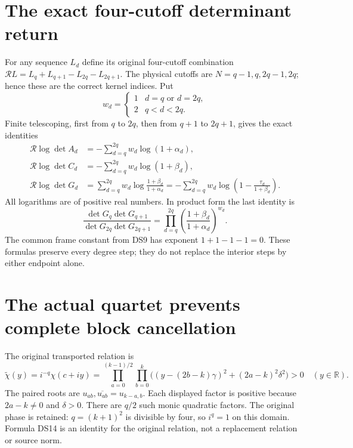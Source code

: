 \documentclass[11pt]{article}
\newcommand{\R}{\mathbb R}
\begin{document}
\section{The exact four-cutoff determinant return}

For any sequence \(L_d\) define its original four-cutoff combination
\(\mathcal RL=L_q+L_{q+1}-L_{2q}-L_{2q+1}\).
The physical cutoffs are \(N=q-1,q,2q-1,2q\); hence these are the
correct kernel indices. Put
\[
w_d=\begin{cases}1&d=q\text{ or }d=2q,\\2&q<d<2q.\end{cases}
\]
Finite telescoping, first from \(q\) to \(2q\), then from \(q+1\)
to \(2q+1\), gives the exact identities
\begin{equation}\label{eq:return}
\boxed{\begin{aligned}
\mathcal R\log\det A_d
&=-\sum_{d=q}^{2q}w_d\log(1+\alpha_d),\\
\mathcal R\log\det C_d
&=-\sum_{d=q}^{2q}w_d\log(1+\beta_d),\\
\mathcal R\log\det G_d
&=\sum_{d=q}^{2q}w_d
 \log\frac{1+\beta_d}{1+\alpha_d}
=-\sum_{d=q}^{2q}w_d
 \log\left(1-\frac{\tau_d}{1+\beta_d}\right).
\end{aligned}}
\tag{DS13}
\end{equation}
All logarithms are of positive real numbers. In product form the last
identity is
\[
\frac{\det G_q\det G_{q+1}}{\det G_{2q}\det G_{2q+1}}
=\prod_{d=q}^{2q}\left(\frac{1+\beta_d}{1+\alpha_d}\right)^{w_d}.
\]
The common frame constant from DS9 has exponent \(1+1-1-1=0\).
These formulas preserve every degree step; they do not replace the
interior steps by either endpoint alone.

\section{The actual quartet prevents complete block cancellation}

The original transported relation is
\begin{equation}\label{eq:positive-relation}
\widetilde\chi(y)=i^{-q}\chi(c+iy)
=\prod_{a=0}^{(k-1)/2}\prod_{b=0}^{k}
\bigl((y-(2b-k)\gamma)^2+(2a-k)^2\delta^2\bigr)>0
\quad(y\in\R).
\tag{DS14}
\end{equation}
The paired roots are \(u_{ab},\overline{u_{ab}}=u_{k-a,b}\).
Each displayed factor is positive because \(2a-k\ne0\) and
\(\delta>0\). There are \(q/2\) such monic quadratic factors.
The original phase is retained: \(q=(k+1)^2\) is divisible by four,
so \(i^q=1\) on this domain. Formula DS14 is an identity for the
original relation, not a replacement relation or source norm.
\end{document}
